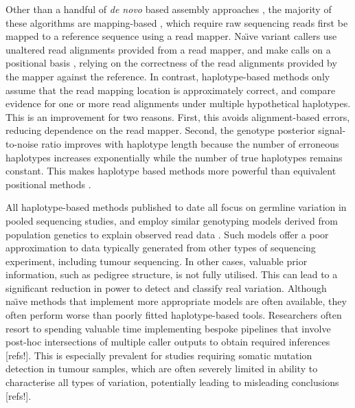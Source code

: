 \documentclass[notitlepage, twocolumn]{article}
\begin{document}
Other than a handful of \emph{de novo} based assembly approaches \cite{cortex}, the majority of these algorithms are mapping-based \cite{gatk, freebayes, platypus}, which require raw sequencing reads first be mapped to a reference sequence using a read mapper. Na\"\i ve variant callers use unaltered read alignments provided from a read mapper, and make calls on a positional basis \cite{samtools}, relying on the correctness of the read alignments provided by the mapper against the reference. In contrast, haplotype-based methods only assume that the read mapping location is approximately correct, and compare evidence for one or more read alignments under multiple hypothetical haplotypes. This is an improvement for two reasons. First, this avoids alignment-based errors, reducing dependence on the read mapper. Second, the genotype posterior signal-to-noise ratio improves with haplotype length because the number of erroneous haplotypes increases exponentially while the number of true haplotypes remains constant. This makes haplotype based methods more powerful than equivalent positional methods \cite{haplotype-calling}.

All haplotype-based methods published to date all focus on germline variation in pooled sequencing studies, and employ similar genotyping models derived from population genetics to explain observed read data \cite{gatk, freebayes, platypus}. Such models offer a poor approximation to data typically generated from other types of sequencing experiment, including tumour sequencing. In other cases, valuable prior information, such as pedigree structure, is not fully utilised. This can lead to a significant reduction in power to detect and classify real variation. Although na\"\i ve methods that implement more appropriate models are often available, they often perform worse than poorly fitted haplotype-based tools. Researchers often resort to spending valuable time implementing bespoke pipelines that involve post-hoc intersections of multiple caller outputs to obtain required inferences [refs!]. This is especially prevalent for studies requiring somatic mutation detection in tumour samples, which are often severely limited in ability to characterise all types of variation, potentially leading to misleading conclusions [refs!].
\end{document}
